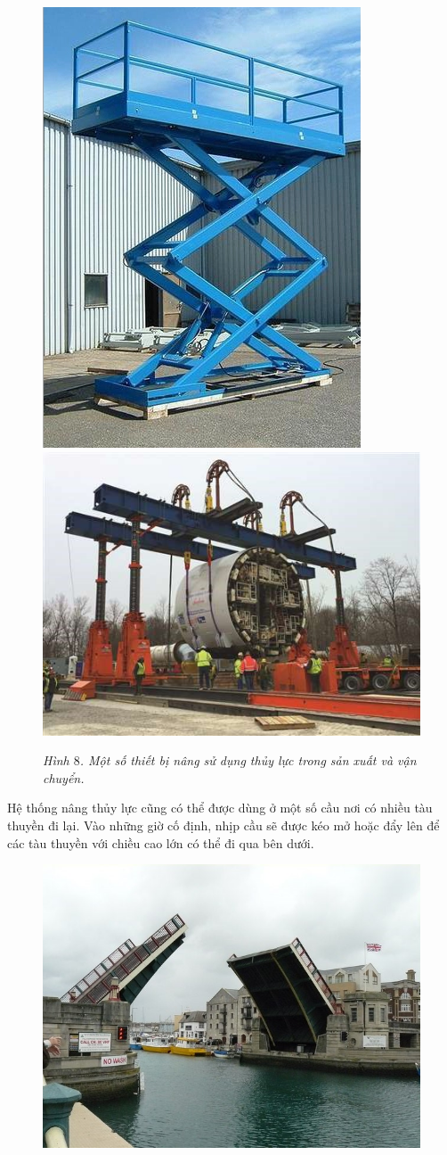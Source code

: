 \begin{multicols}{2}
\begin{figure}[H]
		\includegraphics[height= 0.465\linewidth]{17}
		\includegraphics[height= 0.465\linewidth]{18}
		\caption{\small\textit{\color{timhieukhoahoc}Hình $8$. Một số thiết bị nâng sử dụng thủy lực trong sản xuất và vận chuyển.}}
		\vspace*{-10pt}
	\end{figure}
	Hệ thống nâng thủy lực cũng có thể được dùng ở một số cầu nơi có nhiều tàu thuyền đi lại. Vào những giờ cố định, nhịp cầu sẽ được kéo mở hoặc đẩy lên để các tàu thuyền với chiều cao lớn có thể đi qua bên dưới.
	\begin{figure}[H]
		\vspace*{-5pt}
		\centering
		\captionsetup{labelformat= empty, justification=centering}
		\includegraphics[width= 1\linewidth]{19}

\end{figure}
\end{multicols}
